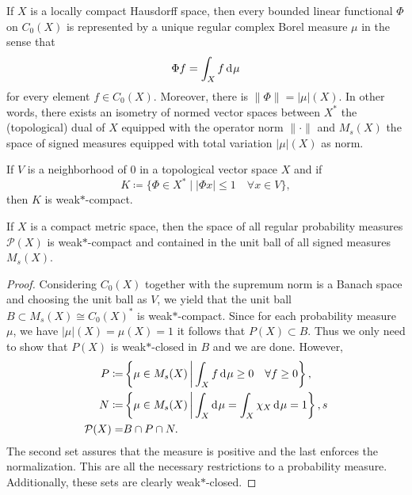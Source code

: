 \begin{thm}
  \label{thm:riesz-markow}
  If \(X\) is a locally compact Hausdorff space, then every bounded linear functional \(\Phi\) on \(C_0(X)\) is represented by a unique regular complex Borel measure \(\mu\) in the sense that \[
    \Phi f = \int_X f \d\mu
  \]
  for every element \(f \in C_0(X)\). Moreover, there is \(\|\Phi\| = |\mu|(X)\). In other words, there exists an isometry of normed vector spaces between \(X^\ast\) the (topological) dual of \(X\) equipped with the operator norm \(\|\cdot \|\) and \(M_{s}(X)\) the space of signed measures equipped with total variation \(|\mu|(X)\) as norm.
\end{thm}

\begin{thm}
  If \(V\) is a neighborhood of 0 in a topological vector space \(X\) and if
  \[
    K \coloneqq \{ \Phi \in X^\ast \mid |\Phi x| \leq 1 \quad \forall x \in V\},
  \]
  then \(K\) is weak\(\ast\)-compact.
\end{thm}

\begin{cor}
  \label{cor:banach-alaoglu}
  If \(X\) is a compact metric space, then the space of all regular probability measures \(\mathcal{P}(X)\) is weak\(\ast\)-compact and contained in the unit ball of all signed measures \(M_{s}(X)\).
\end{cor}

\begin{proof}
  Considering \(C_0(X)\) together with the supremum norm is a Banach space and choosing the unit ball as \(V\), we yield that the unit ball \(B \subset M_s(X) \cong C_0(X)^\ast\) is weak\(\ast\)-compact. Since for each probability measure \(\mu\), we have \(|\mu|(X) = \mu(X) = 1\) it follows that \(P(X) \subset B\). Thus we only need to show that \(P(X)\) is weak\(\ast\)-closed in \(B\) and we are done. However,
  \begin{align*}
    P \coloneqq & \left\{\mu \in M_s(X) \relmid \int_X f \d\mu \geq 0 \quad \forall f \geq 0\right\},\\
    N \coloneqq & \left\{\mu \in M_s(X) \relmid \int_X \d\mu = \int_X \chi_X \d\mu = 1\right\},s\\
    \mathcal{P}(X)  = & B \cap P \cap N.
  \end{align*}
  The second set assures that the measure is positive and the last enforces the normalization. This are all the necessary restrictions to a probability measure. Additionally, these sets are clearly weak\(\ast\)-closed.
\end{proof}

